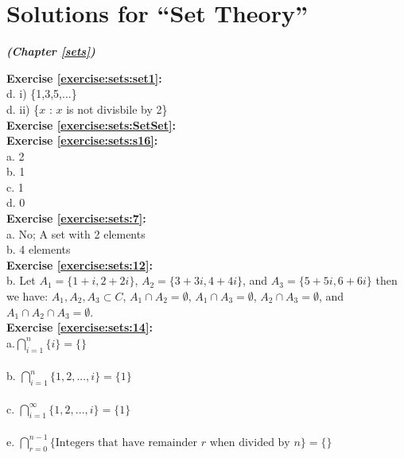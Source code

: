 
\section{Solutions for ``Set Theory''}
\noindent\textbf{\textit{ (Chapter \ref{sets})}}\bigskip

\noindent\textbf{Exercise \ref{exercise:sets:set1}:}\\
d. i) \{1,3,5,...\}\\
d. ii) \{$x$ : $x$ is not divisbile by 2\}\\

\noindent\textbf{Exercise \ref{exercise:sets:SetSet}:}\\

\noindent\textbf{Exercise \ref{exercise:sets:s16}:}\\
a. 2\\
b. 1\\
c. 1\\
d. 0\\

\noindent\textbf{Exercise \ref{exercise:sets:7}:}\\
a. No; A set with 2 elements\\
b. 4 elements\\


\noindent\textbf{Exercise \ref{exercise:sets:12}:}\\
b. Let $A_1=\{ 1+i,2+2i\}$, $A_2=\{ 3+3i,4+4i\}$, and $A_3=\{5+5i,6+6i\}$ then we have:
$A_1,A_2,A_3 \subset C$, $A_1 \cap A_2=\emptyset$, $A_1 \cap A_3=\emptyset$, $A_2 \cap A_3=\emptyset$, and $A_1 \cap A_2 \cap A_3=\emptyset$.\\

\noindent\textbf{Exercise \ref{exercise:sets:14}:}\\
a.$\bigcap_{i = 1}^{n}  \{i\}=\{\}$\\
\\
b. $\bigcap^{n}_{i=1} \{ 1,2,...,i \}=\{1\}$\\
\\
c. $\bigcap^{\infty}_{i=1} \{ 1,2,...,i \}=\{1\}$\\
\\
e. $\bigcap_{r = 0}^{n-1}  \{\mbox{Integers that have remainder }r \mbox{ when divided by }n\}=\{\}$\\

